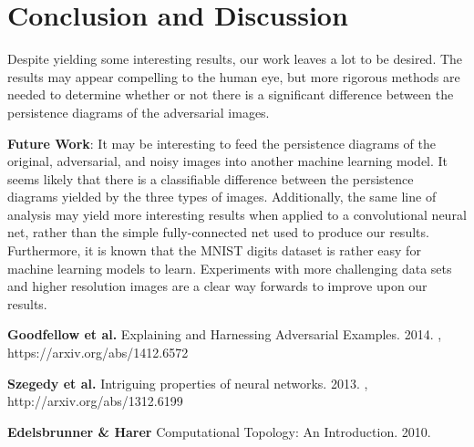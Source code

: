 \documentclass[twoside,twocolumn]{article}
\begin{document}

\section{Conclusion and Discussion}

Despite yielding some interesting results, our work leaves a lot to be desired. The results may appear compelling to the human eye, but more rigorous methods are needed to determine whether or not there is a significant difference between the persistence diagrams of the adversarial images.

\textbf{Future Work}: It may be interesting to feed the persistence diagrams of the original, adversarial, and noisy images into another machine learning model. It seems likely that there is a classifiable difference between the persistence diagrams yielded by the three types of images. Additionally, the same line of analysis may yield more interesting results when applied to a convolutional neural net, rather than the simple fully-connected net used to produce our results. Furthermore, it is known that the MNIST digits dataset is rather easy for machine learning models to learn. Experiments with more challenging data sets and higher resolution images are a clear way forwards to improve upon our results.




\begin{thebibliography}{99} %

\textbf{Goodfellow et al.}
\newblock Explaining and Harnessing Adversarial Examples. 2014.
, https://arxiv.org/abs/1412.6572

\textbf{Szegedy et al.}
\newblock Intriguing properties of neural networks. 2013.
, http://arxiv.org/abs/1312.6199
 
\textbf{Edelsbrunner \& Harer}
\newblock Computational Topology: An Introduction. 2010.
 
 
\end{thebibliography}

\end{document}
